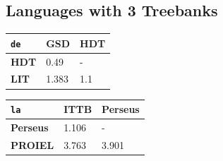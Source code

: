 \begin{minipage}{0.50\textwidth}
    \begin{table}[H]
    \end{table}
    
    \end{minipage}
    \hfill
    \begin{minipage}{0.48\textwidth}
    \subsection*{Languages with 3 Treebanks}
    \begin{table}[H]
    \begin{tabular}{|l|l|l|}
    \hline
    \texttt{de} & \textbf{GSD} & \textbf{HDT} \\
    \hline
    \textbf{HDT} & 0.49 & - \\
    \hline
    \textbf{LIT} & 1.383 & 1.1 \\
    \hline
    \end{tabular}
    \end{table}
    
    \begin{table}[H]
    \begin{tabular}{|l|l|l|}
    \hline
    \texttt{la} & \textbf{ITTB} & \textbf{Perseus} \\
    \hline
    \textbf{Perseus} & 1.106 & - \\
    \hline
    \textbf{PROIEL} & 3.763 & 3.901 \\
    \hline
    \end{tabular}
    \end{table}
    
    \begin{table}[H]
    \end{table}
    

\end{minipage}
